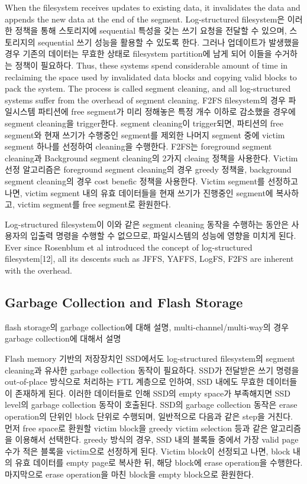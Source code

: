 \documentclass[letterpaper,twocolumn,10pt]{article}
\begin{document}
When the filesystem receives updates to existing data, it invalidates the data and appends the new data at the end of the segment. Log-structured filesystem은 이러한 정책을 통해 스토리지에 sequential 특성을 갖는 쓰기 요청을 전달할 수 있으며, 스토리지의 sequential 쓰기 성능을 활용할 수 있도록 한다. 그러나 업데이트가 발생했을 경우 기존의 데이터는 무효한 상태로 filesystem partition에 남게 되어 이들을 수거하는 정책이 필요하다. Thus, these systems spend considerable amount of time in reclaiming the space used by invalidated data blocks and copying valid blocks to pack the system. The process is called segment cleaning, and all log-structured systems suffer from the overhead of segment cleaning. F2FS filesystem의 경우 파일시스템 파티션에 free segment가 미리 정해놓은 특정 개수 이하로 감소했을 경우에 segment cleaning을 trigger한다. segment cleaning이 trigger되면, 파티션의 free segment와 현재 쓰기가 수행중인 segment를 제외한 나머지 segment 중에 victim segment 하나를 선정하여 cleaning을 수행한다. F2FS는 foreground segment cleaning과 Background segment cleaning의 2가지 cleaing 정책을 사용한다. Victim 선정 알고리즘은 foreground segment cleaning의 경우 greedy\cite{kawaguchi1995flash} 정책을, background segment cleaning의 경우 cost benefic\cite{rosenblum1992design} 정책을 사용한다. 
Victim segment를 선정하고 나면, victim segment 내의 유효 데이터들을 현재 쓰기가 진행중인 segment에 복사하고, victim segment를 free segment로 환원한다. 

Log-structured filesystem이 이와 같은 segment cleaning 동작을 수행하는 동안은 사용자의 입출력 명령을 수행할 수 없으므로, 파일시스템의 성능에 영향을 미치게 된다. Ever since Rosenblum et al introduced the concept of log-structured filesystem[12], all its descents such as JFFS\cite{woodhouse2001jffs}, YAFFS\cite{manning2010yaffs}, LogFS\cite{engel2005logfs}, F2FS\cite{lee2015f2fs} are inherent with the overhead.

\subsection{Garbage Collection and Flash Storage}

flash storage의 garbage collection에 대해 설명, multi-channel/multi-way의 경우 garbage collection에 대해서 설명

Flash memory 기반의 저장장치인 SSD에서도 log-structured filesystem의 segment cleaning과 유사한 garbage collection 동작이 필요하다. SSD가 전달받은 쓰기 명령을 out-of-place 방식으로 처리하는 FTL 계층으로 인하여, SSD 내에도 무효한 데이터들이 존재하게 된다. 이러한 데이터들로 인해 SSD의 empty space가 부족해지면 SSD level의 garbage collection 동작이 호출된다. SSD의 garbage collection 동작은 erase operation의 단위인 block 단위로 수행되며, 일반적으로 다음과 같은 step을 거친다. 먼저 free space로 환원할 victim block을 greedy victim selection 등과 같은 알고리즘을 이용해서 선택한다. greedy 방식의 경우, SSD 내의 블록들 중에서 가장 valid page 수가 적은 블록을 victim으로 선정하게 된다. Victim block이 선정되고 나면, block 내의 유효 데이터를 empty page로 복사한 뒤, 해당 block에 erase operation을 수행한다. 마지막으로 erase operation을 마친 block을 empty block으로 환원한다.
\end{document}
